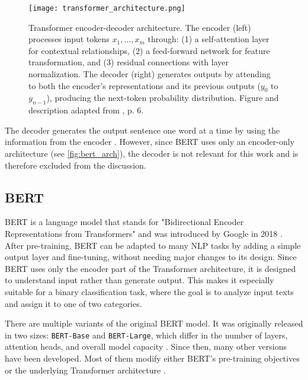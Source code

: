 \begin{figure}[ht]
    \centering
	\texttt{[image: transformer\_architecture.png]}	
        \caption[Transformer encoder-decoder architecture overview]{Transformer encoder-decoder architecture. The encoder (left) processes input tokens \(x_1,\dots,x_m\) through: (1) a self-attention layer for contextual relationships, (2) a feed-forward network for feature transformation, and (3) residual connections with layer normalization. The decoder (right) generates outputs by attending to both the encoder's representations and its previous outputs ($y_0$ to $y_{n-1}$), producing the next-token probability distribution. Figure and description adapted from \textcite{xiaoIntroductionTransformersNLP2023}, p. 6.}
    \label{fig:transformer_architecture}
\end{figure}

The decoder generates the output sentence one word at a time by using the information from the encoder \parencite{xiaoIntroductionTransformersNLP2023}. However, since BERT uses only an encoder-only architecture (see \autoref{fig:bert_arch}), the decoder is not relevant for this work and is therefore excluded from the discussion.

\subsection{BERT}
    BERT is a language model that stands for "Bidirectional Encoder Representations from Transformers" and was introduced by Google in 2018 \parencite{devlinBERTPretrainingDeep2019}. After pre-training, BERT can be adapted to many NLP tasks by adding a simple output layer and fine-tuning, without needing major changes to its design. Since BERT uses only the encoder part of the Transformer architecture, it is designed to understand input rather than generate output. This makes it especially suitable for a binary classification task, where the goal is to analyze input texts and assign it to one of two categories.

    There are multiple variants of the original BERT model. It was originally released in two sizes: \texttt{BERT-Base} and \texttt{BERT-Large}, which differ in the number of layers, attention heads, and overall model capacity \parencite{devlinBERTPretrainingDeep2019}. Since then, many other versions have been developed. Most of them modify either BERT’s pre-training objectives or the underlying Transformer architecture \parencite{libovickyHowLanguageNeutralMultilingual2019}.


